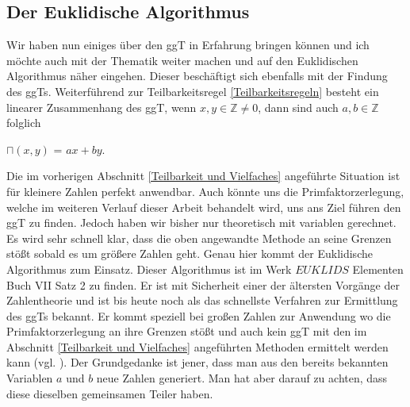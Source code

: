 \documentclass[german,12pt,a4paper]{article}
\begin{document}
\subsection{Der Euklidische Algorithmus}\label{Der Euklidische Algorithmus}
Wir haben nun einiges über den ggT in Erfahrung bringen können und ich möchte auch mit der Thematik weiter machen und auf den Euklidischen Algorithmus näher eingehen.
Dieser beschäftigt sich ebenfalls mit der Findung des ggTs.\newline
Weiterführend zur Teilbarkeitsregel \ref{Teilbarkeitsregeln} besteht ein linearer Zusammenhang des ggT, wenn $x, y \in \mathbb{Z} \neq 0$, dann sind auch $a, b \in \mathbb{Z}$ folglich
\begin{center}
$\sqcap(x, y)$ = $ax + by$.
\end{center}
Die im vorherigen Abschnitt \ref{Teilbarkeit und Vielfaches} angeführte Situation ist für kleinere Zahlen perfekt anwendbar.
Auch könnte uns die Primfaktorzerlegung, welche im weiteren Verlauf dieser Arbeit behandelt wird, uns ans Ziel führen den ggT zu finden.
Jedoch haben wir bisher nur theoretisch mit variablen gerechnet.
Es wird sehr schnell klar, dass die oben angewandte Methode an seine Grenzen stößt sobald es um größere Zahlen geht.
Genau hier kommt der Euklidische Algorithmus zum Einsatz.
Dieser Algorithmus ist im Werk $EUKLIDS$ Elementen Buch VII Satz 2 zu finden.
Er ist mit Sicherheit einer der ältersten Vorgänge der Zahlentheorie und ist bis heute noch als das schnellste Verfahren zur Ermittlung des ggTs bekannt.
Er kommt speziell bei großen Zahlen zur Anwendung wo die Primfaktorzerlegung an ihre Grenzen stößt und auch kein ggT mit den im Abschnitt \ref{Teilbarkeit und Vielfaches} angeführten Methoden ermittelt werden kann (vgl. \cite[83--84]{Crandall2005}).\newline
Der Grundgedanke ist jener, dass man aus den bereits bekannten Variablen $a$ und $b$ neue Zahlen generiert.
Man hat aber darauf zu achten, dass diese dieselben gemeinsamen Teiler haben.
\end{document}

